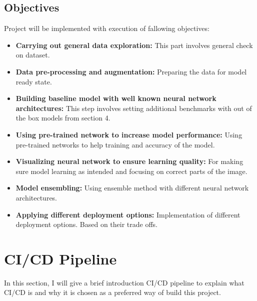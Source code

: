 \subsection{Objectives}
Project will be implemented with execution of fallowing objectives:
\begin{itemize}
    \item \textbf{Carrying out general data exploration: }This part involves general check on dataset.
    \item \textbf{Data pre-processing and augmentation: }Preparing the data for model ready state.
    \item \textbf{Building baseline model with well known neural network architectures: }This step involves setting additional benchmarks with out of the box models from section 4.
    \item \textbf{Using pre-trained network to increase model performance: }Using pre-trained networks to help training and accuracy of the model.
    \item \textbf{Visualizing neural network to ensure learning quality: } For making sure model learning as intended and focusing on correct parts of the image.
    \item \textbf{Model ensembling: }Using ensemble method with different neural network architectures.
    \item \textbf{Applying different deployment options: } Implementation of different deployment options. Based on their trade offs. 
\end{itemize}

\section{CI/CD Pipeline} \label{sec:cicd}
In this section, I will give a brief introduction CI/CD pipeline to explain what CI/CD is and why it is chosen as a preferred way of build this project.

